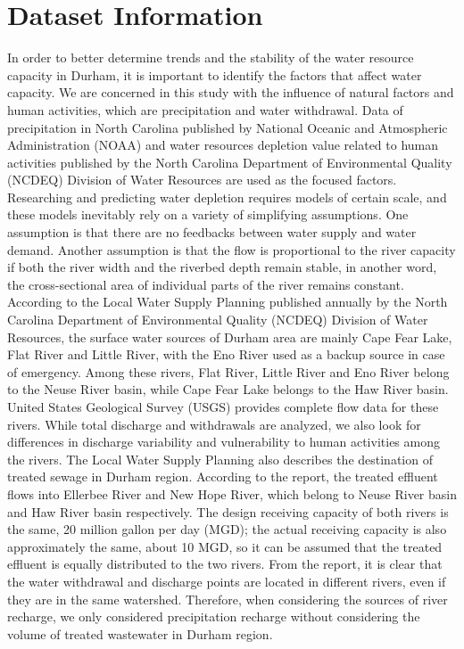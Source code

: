 \documentclass[
  12pt,
]{article}
\begin{document}
\newpage

\hypertarget{dataset-information}{%
\section{Dataset Information}\label{dataset-information}}

In order to better determine trends and the stability of the water
resource capacity in Durham, it is important to identify the factors
that affect water capacity. We are concerned in this study with the
influence of natural factors and human activities, which are
precipitation and water withdrawal. Data of precipitation in North
Carolina published by National Oceanic and Atmospheric Administration
(NOAA) and water resources depletion value related to human activities
published by the North Carolina Department of Environmental Quality
(NCDEQ) Division of Water Resources are used as the focused factors.
Researching and predicting water depletion requires models of certain
scale, and these models inevitably rely on a variety of simplifying
assumptions. One assumption is that there are no feedbacks between water
supply and water demand. Another assumption is that the flow is
proportional to the river capacity if both the river width and the
riverbed depth remain stable, in another word, the cross-sectional area
of individual parts of the river remains constant. According to the
Local Water Supply Planning published annually by the North Carolina
Department of Environmental Quality (NCDEQ) Division of Water Resources,
the surface water sources of Durham area are mainly Cape Fear Lake, Flat
River and Little River, with the Eno River used as a backup source in
case of emergency. Among these rivers, Flat River, Little River and Eno
River belong to the Neuse River basin, while Cape Fear Lake belongs to
the Haw River basin. United States Geological Survey (USGS) provides
complete flow data for these rivers. While total discharge and
withdrawals are analyzed, we also look for differences in discharge
variability and vulnerability to human activities among the rivers. The
Local Water Supply Planning also describes the destination of treated
sewage in Durham region. According to the report, the treated effluent
flows into Ellerbee River and New Hope River, which belong to Neuse
River basin and Haw River basin respectively. The design receiving
capacity of both rivers is the same, 20 million gallon per day (MGD);
the actual receiving capacity is also approximately the same, about 10
MGD, so it can be assumed that the treated effluent is equally
distributed to the two rivers. From the report, it is clear that the
water withdrawal and discharge points are located in different rivers,
even if they are in the same watershed. Therefore, when considering the
sources of river recharge, we only considered precipitation recharge
without considering the volume of treated wastewater in Durham region.
\end{document}
